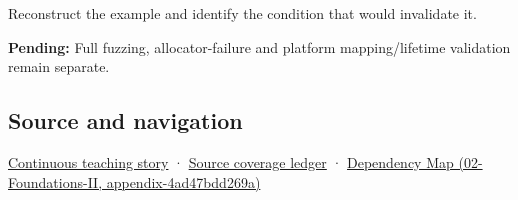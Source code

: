 Reconstruct the example and identify the condition that would invalidate it.

\textbf{Pending:} Full fuzzing, allocator-failure and platform mapping/lifetime validation remain separate.

\subsection{Source and navigation}\label{source-and-navigation}

\href{Continuous\%20Notes/Computing\%20Foundations\%20-\%20From\%20Bits\%20to\%20C++\%20and\%20Systems\%20APIs\#Bytes\%20become\%20a\%20durable\%20agreement}{Continuous teaching story} · \hyperref[appendix-fd090d982a15]{Source coverage ledger} · \href{}{Dependency Map (02-Foundations-II, appendix-4ad47bdd269a)}
